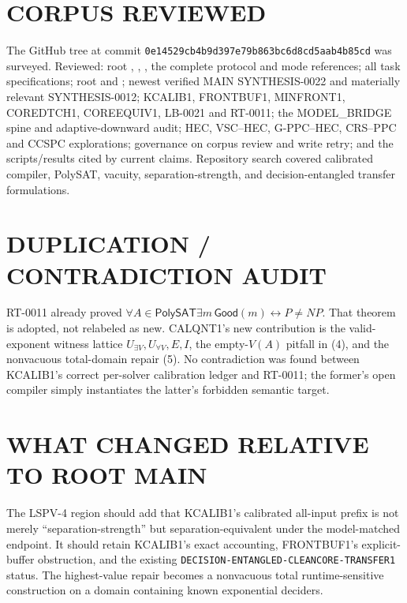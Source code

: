 \documentclass[11pt]{article}
\newcommand{\PolySAT}{\mathsf{PolySAT}}
\begin{document}
\section{CORPUS REVIEWED}
The GitHub tree at commit
\texttt{0e14529cb4b9d397e79b863bc6d8cd5aab4b85cd} was surveyed.  Reviewed:
root , , , the complete
 protocol and mode references;
all task specifications; root  and ; newest
verified MAIN SYNTHESIS-0022 and materially relevant SYNTHESIS-0012;
KCALIB1, FRONTBUF1, MINFRONT1, COREDTCH1, COREEQUIV1, LB-0021 and RT-0011;
the MODEL\_BRIDGE spine and adaptive-downward audit; HEC, VSC--HEC,
G-PPC--HEC, CRS--PPC and CCSPC explorations; governance on corpus review and
write retry; and the scripts/results cited by current claims.  Repository
search covered calibrated compiler, PolySAT, vacuity, separation-strength,
and decision-entangled transfer formulations.

\section{DUPLICATION / CONTRADICTION AUDIT}
RT-0011 already proved
$\forall A\in\PolySAT\exists m\,\mathsf{Good}(m)
\leftrightarrow P\ne NP$.  That theorem is adopted, not relabeled as new.
CALQNT1's new contribution is the valid-exponent witness lattice
$U_{\exists V},U_{\forall V},E,I$, the empty-$V(A)$ pitfall in (4), and the
nonvacuous total-domain repair (5).  No contradiction was found between
KCALIB1's correct per-solver calibration ledger and RT-0011; the former's
open compiler simply instantiates the latter's forbidden semantic target.

\section{WHAT CHANGED RELATIVE TO ROOT MAIN}
The LSPV-4 region should add that KCALIB1's calibrated all-input prefix is
not merely ``separation-strength'' but separation-equivalent under the
model-matched endpoint.  It should retain KCALIB1's exact accounting,
FRONTBUF1's explicit-buffer obstruction, and the existing
\texttt{DECISION-ENTANGLED-CLEANCORE-TRANSFER1} status.  The highest-value
repair becomes a nonvacuous total runtime-sensitive construction on a domain
containing known exponential deciders.
\end{document}
